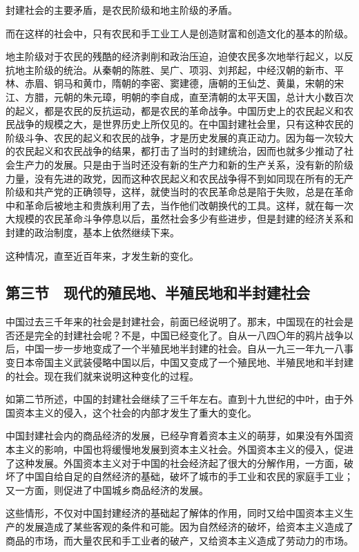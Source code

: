 封建社会的主要矛盾，是农民阶级和地主阶级的矛盾。

而在这样的社会中，只有农民和手工业工人是创造财富和创造文化的基本的阶级。

地主阶级对于农民的残酷的经济剥削和政治压迫，迫使农民多次地举行起义，以反抗地主阶级的统治。从秦朝的陈胜、吴广、项羽、刘邦起，中经汉朝的新市、平林、赤眉、铜马和黄巾，隋朝的李密、窦建德，唐朝的王仙芝、黄巢，宋朝的宋江、方腊，元朝的朱元璋，明朝的李自成，直至清朝的太平天国，总计大小数百次的起义，都是农民的反抗运动，都是农民的革命战争。中国历史上的农民起义和农民战争的规模之大，是世界历史上所仅见的。在中国封建社会里，只有这种农民的阶级斗争、农民的起义和农民的战争，才是历史发展的真正动力。因为每一次较大的农民起义和农民战争的结果，都打击了当时的封建统治，因而也就多少推动了社会生产力的发展。只是由于当时还没有新的生产力和新的生产关系，没有新的阶级力量，没有先进的政党，因而这种农民起义和农民战争得不到如同现在所有的无产阶级和共产党的正确领导，这样，就使当时的农民革命总是陷于失败，总是在革命中和革命后被地主和贵族利用了去，当作他们改朝换代的工具。这样，就在每一次大规模的农民革命斗争停息以后，虽然社会多少有些进步，但是封建的经济关系和封建的政治制度，基本上依然继续下来。

这种情况，直至近百年来，才发生新的变化。

\subsection{第三节　现代的殖民地、半殖民地和半封建社会}

中国过去三千年来的社会是封建社会，前面已经说明了。那末，中国现在的社会是否还是完全的封建社会呢？不是，中国已经变化了。自从一八四〇年的鸦片战争以后，中国一步一步地变成了一个半殖民地半封建的社会。自从一九三一年九一八事变日本帝国主义武装侵略中国以后，中国又变成了一个殖民地、半殖民地和半封建的社会。现在我们就来说明这种变化的过程。

如第二节所述，中国的封建社会继续了三千年左右。直到十九世纪的中叶，由于外国资本主义的侵入，这个社会的内部才发生了重大的变化。

中国封建社会内的商品经济的发展，已经孕育着资本主义的萌芽，如果没有外国资本主义的影响，中国也将缓慢地发展到资本主义社会。外国资本主义的侵入，促进了这种发展。外国资本主义对于中国的社会经济起了很大的分解作用，一方面，破坏了中国自给自足的自然经济的基础，破坏了城市的手工业和农民的家庭手工业；又一方面，则促进了中国城乡商品经济的发展。

这些情形，不仅对中国封建经济的基础起了解体的作用，同时又给中国资本主义生产的发展造成了某些客观的条件和可能。因为自然经济的破坏，给资本主义造成了商品的市场，而大量农民和手工业者的破产，又给资本主义造成了劳动力的市场。

